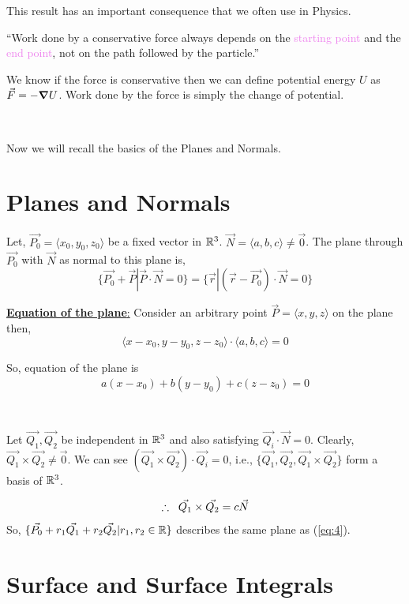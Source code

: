 \documentclass[../Analysis-3.tex]{subfiles}
\begin{document}
This result has an important consequence that we often use in Physics.

``Work done by a conservative force always depends on the \textcolor{violet}{starting point} and the \textcolor{violet}{end point}, not on the path followed by the particle.''
\vspace*{0.2cm}

We know if the force is conservative then we can define potential energy $U$ as $ \vec{F} = -\grad U$. Work done by the force is simply the change of potential.

\

Now we will recall the basics of the Planes and Normals.


\section{Planes and Normals}
Let, $\vec{P_0} = \langle x_0,y_0,z_0 \rangle$ be a fixed vector in $\mathbb{R}^3$. $\vec{N} = \langle a,b,c \rangle \neq \vec{0}$. The plane through $\vec{P_0}$ with $\vec{N}$ as normal to this plane is,
\[ \{\vec{P_0} + \vec{P} | \vec{P}\cdot \vec{N} = 0\} = \{\vec{r} | (\vec{r}-\vec{P_0})\cdot \vec{N} = 0 \} \]

\underline{\textbf{Equation of the plane}:} Consider an arbitrary point $\vec{P} = \langle x,y,z\rangle$ on the plane then, $$\langle x-x_0,y-y_0,z-z_0\rangle \cdot \langle a,b,c \rangle = 0$$

So, equation of the plane is
\begin{equation}
  a(x-x_0)+b(y-y_0) +c(z-z_0)= 0 \label{eq:4}
\end{equation}

\

Let $\vec{Q_1},\vec{Q_2}$ be independent in $\mathbb{R}^3$ and also satisfying $\vec{Q_i} \cdot \vec{N} = 0$. Clearly, $\vec{Q_1}\times \vec{Q_2} \neq \vec{0}$. We can see $(\vec{Q_1}\times \vec{Q_2}) \cdot \vec{Q_i} = 0$, i.e., $\{\vec{Q_1},\vec{Q_2},\vec{Q_1}\times \vec{Q_2}\}$ form a basis of $\mathbb{R}^3$.

$$\therefore \hspace{0.2cm}\vec{Q_1}\times \vec{Q_2} = c \vec{N}$$
So, $\{\vec{P_0} + r_1 \vec{Q_1} + r_2 \vec{Q_2} | r_1,r_2 \in \mathbb{R} \}$ describes the same plane as (\ref{eq:4}).

\section{Surface and Surface Integrals}
\end{document}
